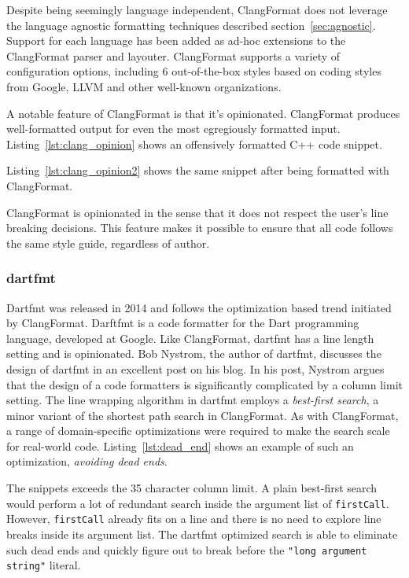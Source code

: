 Despite being seemingly language independent, ClangFormat does not leverage the language agnostic formatting techniques described section~\ref{sec:agnostic}.
Support for each language has been added as ad-hoc extensions to the ClangFormat parser and layouter.
ClangFormat supports a variety of configuration options, including 6 out-of-the-box styles based on coding styles from Google, LLVM and other well-known organizations.

A notable feature of ClangFormat is that it's opinionated.
ClangFormat produces well-formatted output for even the most egregiously formatted input.
Listing~\ref{lst:clang_opinion} shows an offensively formatted C++ code snippet.

Listing~\ref{lst:clang_opinion2} shows the same snippet after being formatted with ClangFormat.

ClangFormat is opinionated in the sense that it does not respect the user's line breaking decisions.
This feature makes it possible to ensure that all code follows the same style guide, regardless of author.

\subsubsection{dartfmt}
Dartfmt\autocite{nystrom_dart_style_2014} was released in 2014 and follows the optimization based trend initiated by ClangFormat.
Darftfmt is a code formatter for the Dart programming language, developed at Google.
Like ClangFormat, dartfmt has a line length setting and is opinionated.
Bob Nystrom, the author of dartfmt, discusses the design of dartfmt in an excellent post\autocite{nystrom_hardest_2015} on his blog.
In his post, Nystrom argues that the design of a code formatters is significantly complicated by a column limit setting.
The line wrapping algorithm in dartfmt employs a \emph{best-first search}\autocite{pearl_heuristics:_1984},
a minor variant of the shortest path search in ClangFormat.
As with ClangFormat, a range of domain-specific optimizations were required to make the search scale for real-world code.
Listing~\ref{lst:dead_end} shows an example of such an optimization, \emph{avoiding dead ends}.

The snippets exceeds the 35 character column limit.
A plain best-first search would perform a lot of redundant search inside the argument list of \texttt{firstCall}.
However, \texttt{firstCall} already fits on a line and there is no need to explore line breaks inside its argument list.
The dartfmt optimized search is able to eliminate such dead ends and quickly figure out to break before the \texttt{"long argument string"} literal.

